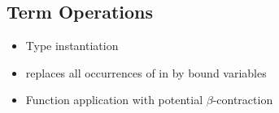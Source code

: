 \subsection{Term Operations}
\begin{frame}
    \begin{itemize}[<+->]
      \item Type instantiation
        \begin{quote}
            \begin{isabelle}
                 
            \end{isabelle}
        \end{quote}
      \item {} replaces all occurrences of  in  by bound variables
      \item Function application with potential \(\beta\)-contraction
          \begin{quote}
          \end{quote}
    \end{itemize}
  \end{frame}